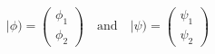 \begin{equation}
\vert \phi ) = \begin{pmatrix} \phi_1 \\ \phi_2 \end{pmatrix} \quad
\textrm{and} \quad 
\vert \psi ) = \begin{pmatrix} \psi_1 \\ \psi_2 \end{pmatrix} 
\label{eq:vectors}
\end{equation}

